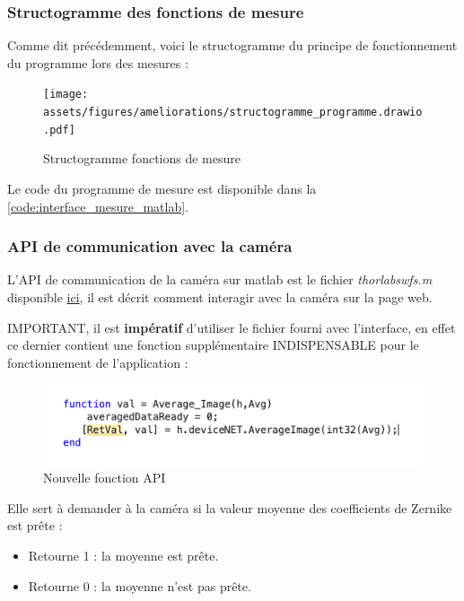 \subsubsection{Structogramme des fonctions de mesure}
Comme dit précédemment, voici le structogramme du principe de fonctionnement du programme lors des mesures :
\begin{figure}[H]
    \centering
    \texttt{[image: assets/figures/ameliorations/structogramme\_programme.drawio.pdf]}
    \caption{Structogramme fonctions de mesure}
\end{figure}
Le code du programme de mesure est disponible dans la \autoref{code:interface_mesure_matlab}.

\subsubsection{API de communication avec la caméra}
L'API de communication de la caméra sur matlab est le fichier \textit{thorlabswfs.m} disponible \href{https://ch.mathworks.com/matlabcentral/fileexchange/116485-driver-for-thorlabs-shack-hartmann-wavefront-sensors-wfs}{ici},
il est décrit comment interagir avec la caméra sur la page web.

\color{red}IMPORTANT\color{black}, il est \textbf{impératif} d'utiliser le fichier fourni avec l'interface, en effet ce dernier contient une fonction supplémentaire INDISPENSABLE pour le fonctionnement de l'application :
\begin{figure}[H]
    \centering
    \includegraphics[width = \textwidth,]{assets/figures/ameliorations/nouvelle_fonction_API.png}
    \caption{Nouvelle fonction API}
\end{figure}
Elle sert à demander à la caméra si la valeur moyenne des coefficients de Zernike est prête :
\begin{itemize}
    \item Retourne 1 : la moyenne est prête.
    \item Retourne 0 : la moyenne n'est pas prête.
\end{itemize}

